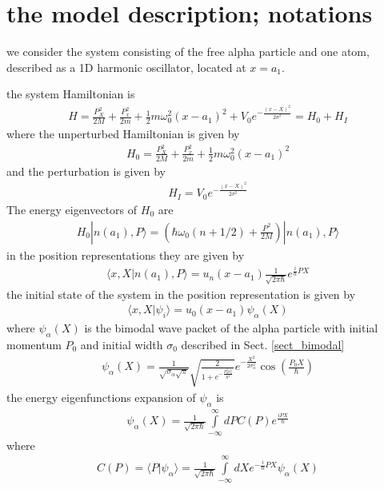 \section{the model description; notations}
\label{sec:the-model-description-notations}
we consider the system consisting of the free alpha particle and one atom, described as a 1D harmonic oscillator, located at $x=a_1$.

the system Hamiltonian is
\begin{align}
  H=\frac{P_X^2}{2M}+\frac{P_x^2}{2m}+\frac{1}{2}m\omega_0^2(x-a_1)^2+V_0e^{-\frac{(x-X)^2}{2\sigma^2}}=H_0+H_I
\end{align}
where the unperturbed Hamiltonian is given by
\begin{align}
  H_0=\frac{P_X^2}{2M}+\frac{P_x^2}{2m}+\frac{1}{2}m\omega_0^2(x-a_1)^2
\end{align}
and the perturbation is given by
\begin{align}
  H_I=V_0e^{-\frac{(x-X)^2}{2\sigma^2}}
\end{align}
The energy eigenvectors of $H_0$ are
\begin{align}
  H_0|n(a_1),P\rangle = (\hbar\omega_0(n+1/2)+\frac{P^2}{2M})|n(a_1),P\rangle
\end{align}
in the position representations they are given by
\begin{align}
  \langle x,X|n(a_1),P\rangle = u_n(x-a_1)\frac{1}{\sqrt{2\pi\hbar}}e^{\frac{i}{\hbar}PX}
\end{align}
the initial state of the system in the position representation is given by
\begin{align}
  \langle x,X|\psi_i\rangle = u_0(x-a_1) \psi_\alpha(X)
\end{align}
where $\psi_\alpha(X)$ is the bimodal  wave packet of the alpha particle with initial momentum $P_0$ and initial width $\sigma_0$ described in Sect. \ref{sect_bimodal}
\begin{align}
  \psi_\alpha(X) = \frac{1}{\sqrt{\sigma_\alpha\sqrt{\pi}}}\sqrt{\frac{2}{1+e^{-\frac{P_0^2\sigma_\alpha^2}{\hbar^2}}}}e^{-\frac{X^2}{2\sigma_\alpha^2}}\cos\left(\frac{P_0 X}{\hbar}\right)\label{psi(X_0)-tdse_tdpt}
\end{align}
the energy eigenfunctions expansion of $\psi_\alpha$ is
\begin{align}
  \psi_\alpha(X)=\frac1{\sqrt{2\pi\hbar}}\int\limits_{-\infty}^{\infty}dP C(P)e^{\frac{iPX}{\hbar}}
\end{align}
where
\begin{align}
  C(P) = \langle P|\psi_\alpha\rangle = \frac{1}{\sqrt{2\pi\hbar}}\int\limits_{-\infty}^{\infty}dX e^{-\frac{i}{\hbar}PX}\psi_\alpha(X)
\end{align}
